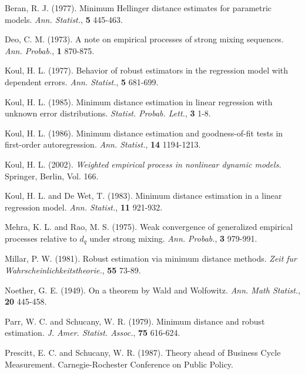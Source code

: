 \begin{thebibliography}{17}

\bibitem{}  Beran, R. J. (1977). Minimum Hellinger distance estimates for parametric models. \textit{Ann. Statist.}, \textbf{5} 445-463.


\bibitem{} Deo, C. M. (1973). A note on empirical processes of strong mixing sequences. \textit{Ann. Probab.}, \textbf{1} 870-875.




\bibitem{} Koul, H. L. (1977). Behavior of robust estimators in the regression model with dependent errors. \textit{Ann. Statist.}, \textbf{5} 681-699.

\bibitem{} Koul, H. L. (1985). Minimum distance estimation in linear regression with unknown error distributions. \textit{Statist. Probab. Lett.}, \textbf{3} 1-8.


\bibitem{} Koul, H. L. (1986). Minimum distance estimation and goodness-of-fit tests in first-order autoregression. \textit{Ann. Statist.}, \textbf{14} 1194-1213.

\bibitem{} Koul, H. L. (2002). \textit{Weighted empirical process in nonlinear dynamic models.} Springer, Berlin, Vol. 166.


\bibitem{} Koul, H. L. and De Wet, T. (1983). Minimum distance estimation in a linear regression model. \textit{Ann. Statist.}, \textbf{11} 921-932.

\bibitem{} Mehra, K. L. and Rao, M. S. (1975). Weak convergence of generalized empirical processes relative to $d_{q}$ under strong mixing. \textit{Ann. Probab.}, \textbf{3} 979-991.

\bibitem{} Millar, P. W. (1981). Robust estimation via minimum distance methods. \textit{Zeit fur Wahrscheinlichkeitstheorie.}, \textbf{55} 73-89.

\bibitem{} Noether, G. E. (1949). On a theorem by Wald and Wolfowitz. \textit{Ann. Math Statist.}, \textbf{20} 445-458.


\bibitem{}  Parr, W. C. and Schucany, W. R. (1979). Minimum distance and robust estimation. \textit{J. Amer. Statist. Assoc.}, \textbf{75} 616-624.

\bibitem{}  Prescitt, E. C. and Schucany, W. R. (1987). Theory ahead of Business Cycle Measurement. Carnegie-Rochester Conference on Public Policy.
\end{thebibliography}



